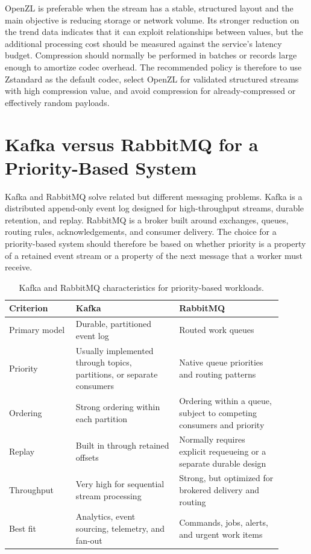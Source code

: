 \documentclass{article}
\begin{document}
OpenZL is preferable when the stream has a stable, structured layout and the
main objective is reducing storage or network volume.  Its stronger reduction
on the trend data indicates that it can exploit relationships between values,
but the additional processing cost should be measured against the service's
latency budget.  Compression should normally be performed in batches or
records large enough to amortize codec overhead.  The recommended policy is
therefore to use Zstandard as the default codec, select OpenZL for validated
structured streams with high compression value, and avoid compression for
already-compressed or effectively random payloads.

\section{Kafka versus RabbitMQ for a Priority-Based System}

Kafka and RabbitMQ solve related but different messaging problems.  Kafka is a
distributed append-only event log designed for high-throughput streams,
durable retention, and replay.  RabbitMQ is a broker built around exchanges,
queues, routing rules, acknowledgements, and consumer delivery.  The choice for
a priority-based system should therefore be based on whether priority is a
property of a retained event stream or a property of the next message that a
worker must receive.

\begin{table}[ht]
\centering
\caption{Kafka and RabbitMQ characteristics for priority-based workloads.}
\label{tab:kafka-rabbitmq}
\begin{tabular}{p{0.22\linewidth}p{0.34\linewidth}p{0.34\linewidth}}
\hline
Criterion & Kafka & RabbitMQ \\
\hline
Primary model & Durable, partitioned event log & Routed work queues \\
Priority & Usually implemented through topics, partitions, or separate consumers & Native queue priorities and routing patterns \\
Ordering & Strong ordering within each partition & Ordering within a queue, subject to competing consumers and priority \\
Replay & Built in through retained offsets & Normally requires explicit requeueing or a separate durable design \\
Throughput & Very high for sequential stream processing & Strong, but optimized for brokered delivery and routing \\
Best fit & Analytics, event sourcing, telemetry, and fan-out & Commands, jobs, alerts, and urgent work items \\
\hline
\end{tabular}
\end{table}
\end{document}

